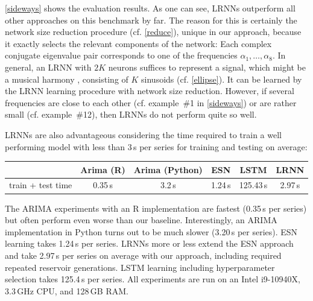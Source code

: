 \documentclass[preprint,12pt,times,authoryear]{elsarticle}%
\theoremstyle{definition}
\begin{document}
\cref{sideways} shows the evaluation results. As one can see, LRNNs outperform
all other approaches on this benchmark by far. The reason for this is certainly
the network size reduction procedure (cf. \cref{reduce}), unique in our approach,
because it exactly selects the relevant components of the network: Each complex
conjugate eigenvalue pair corresponds to one of the frequencies $\alpha_1,\dots,\alpha_8$.
In general, an LRNN with $2K$ neurons suffices to represent a signal, which
might be a musical harmony \citep{Sto17b}, consisting of $K$ sinusoids (cf.
\cref{ellipse}). It can be learned by the LRNN learning procedure with network
size reduction. However, if several frequencies are close to each other (cf.
example~\#1 in \cref{sideways}) or are rather small (cf. example~\#12), then
LRNNs do not perform quite so well.

LRNNs are also advantageous considering the time required to train a well
performing model with less than 3\,s per series for training and testing on average: \\

\noindent \begin{tabular}{cccccc}
\toprule
& Arima (R) & Arima (Python)  & ESN & LSTM & LRNN\\ \midrule
train + test time & 0.35\,s & 3.2\,s & 1.24\,s & 125.43\,s & 2.97\,s \\ \bottomrule
\end{tabular}

\vspace*{2ex}\noindent
The ARIMA experiments with an R implementation are fastest (0.35\,s
per series) but often perform even worse than our baseline. Interestingly, an
ARIMA implementation in Python turns out to be much slower (3.20\,s per series).
ESN learning takes 1.24\,s per series. LRNNs more or less extend the ESN
approach and take 2.97\,s per series on average with our approach, 
including required repeated reservoir generations. LSTM learning including hyperparameter
selection takes 125.4\,s per series. All experiments are run on an Intel
i9-10940X, 3.3\,GHz CPU, and 128\,GB RAM.


\end{document}
